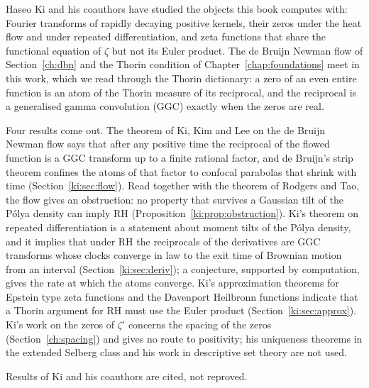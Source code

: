 \label{chap:ki}

Haseo Ki and his coauthors have studied the objects this book computes with: Fourier transforms of rapidly decaying positive kernels, their zeros under the heat flow and under repeated differentiation, and zeta functions that share the functional equation of $\zeta$ but not its Euler product. The de Bruijn Newman flow of Section~\ref{ch:dbn} and the Thorin condition of Chapter~\ref{chap:foundations} meet in this work, which we read through the Thorin dictionary: a zero of an even entire function is an atom of the Thorin measure of its reciprocal, and the reciprocal is a generalised gamma convolution (GGC) exactly when the zeros are real.

Four results come out. The theorem of Ki, Kim and Lee on the de Bruijn Newman flow says that after any positive time the reciprocal of the flowed function is a GGC transform up to a finite rational factor, and de Bruijn's strip theorem confines the atoms of that factor to confocal parabolas that shrink with time (Section~\ref{ki:sec:flow}). Read together with the theorem of Rodgers and Tao, the flow gives an obstruction: no property that survives a Gaussian tilt of the P\'olya density can imply RH (Proposition~\ref{ki:prop:obstruction}). Ki's theorem on repeated differentiation is a statement about moment tilts of the P\'olya density, and it implies that under RH the reciprocals of the derivatives are GGC transforms whose clocks converge in law to the exit time of Brownian motion from an interval (Section~\ref{ki:sec:deriv}); a conjecture, supported by computation, gives the rate at which the atoms converge. Ki's approximation theorems for Epstein type zeta functions and the Davenport Heilbronn functions indicate that a Thorin argument for RH must use the Euler product (Section~\ref{ki:sec:approx}). Ki's work on the zeros of $\zeta'$ concerns the spacing of the zeros (Section~\ref{ch:spacing}) and gives no route to positivity; his uniqueness theorems in the extended Selberg class and his work in descriptive set theory are not used.

Results of Ki and his coauthors are cited, not reproved.
